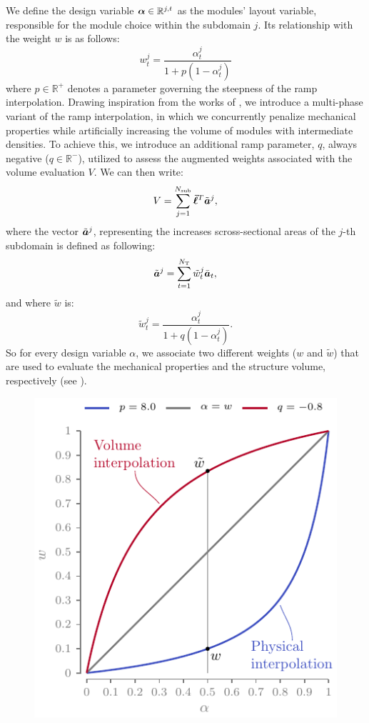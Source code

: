 We define the design variable $\bm{\alpha}\in\mathbb{R}^{j,t}$ as the modules' layout variable, responsible for the module choice within the subdomain $j$. Its relationship with the weight $w$ is as follows:
\begin{equation}
    w_t^j = \frac{\alpha_t^j}{1+p(1-\alpha_t^j)}    
\end{equation}
where $p \in \mathbb{R}^+$ denotes a parameter governing the steepness of the \gls{ramp} interpolation. Drawing inspiration from the works of , we introduce a multi-phase variant of the \gls{ramp} interpolation, in which we concurrently penalize mechanical properties while artificially increasing the volume of modules with intermediate densities. To achieve this, we introduce an additional \gls{ramp} parameter, $q$, always negative ($q \in \mathbb{R}^-$), utilized to assess the augmented weights associated with the volume evaluation $V$. We can then write:
\begin{equation}
    V = \sum_{j=1}^{N_{\text{sub}}}\bm{\bar{\ell}}^T\tilde{\bm{a}}^j,
\end{equation}
where the vector $\tilde{\bm{a}}^j$, representing the increases scross-sectional areas of the $j$-th subdomain is defined as following:
\begin{equation}
    \tilde{\bm{a}}^j = \sum_{t=1}^{N_\text{T}} \tilde{w}_t^j \bar{\bm{a}}_t, 
\end{equation}
and where $\tilde{w}$ is:
\begin{equation}
    \tilde{w}_t^j = \frac{\alpha_t^j}{1+q(1-\alpha_t^j)}.    
\end{equation}
So for every design variable $\alpha$, we associate two different weights ($w$ and $\tilde{w}$) that are used to evaluate the mechanical properties and the structure volume, respectively (see ).


\begin{figure}
    \centering
    \includegraphics{figures/06_DMO/00_ramp/ramp.pdf}
    \caption{}
    \label{fig:06_ramp}
\end{figure}

